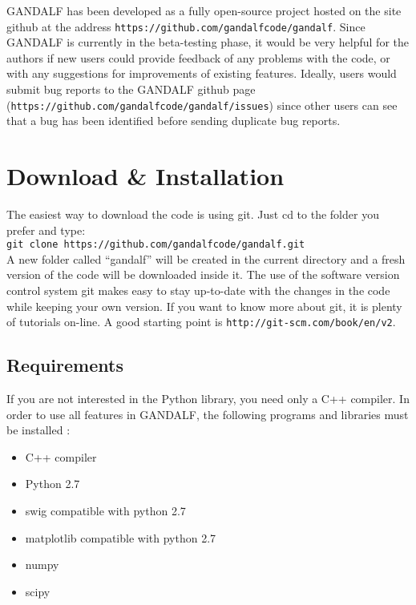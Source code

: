 \documentclass[a4paper]{article}
\newcommand{\var}[1]{\texttt{#1}}
\begin{document}
GANDALF has been developed as a fully open-source project hosted on the site github at the address \var{https://github.com/gandalfcode/gandalf}.  Since GANDALF is currently in the beta-testing phase, it would be very helpful for the authors if new users could provide feedback of any problems with the code, or with any suggestions for improvements of existing features.  Ideally, users would submit bug reports to the GANDALF github page (\var{https://github.com/gandalfcode/gandalf/issues}) since other users can see that a bug has been identified before sending duplicate bug reports.


\newpage


\section{Download \& Installation} \label{S:INSTALL}
The easiest way to download the code is using git. Just cd to the folder you prefer and type:\\
\newline
\noindent \var{git clone https://github.com/gandalfcode/gandalf.git} \\
A new folder called ``gandalf'' will be created in the current directory and a fresh version of the code will be downloaded inside it. The use of the software version control system git makes easy to stay up-to-date with the changes in the code while keeping your own version. If you want to know more about git, it is plenty of tutorials on-line. A good starting point is \var{http://git-scm.com/book/en/v2}.

\subsection{Requirements}

If you are not interested in the Python library, you need only a C++ compiler. In order to use all features in GANDALF, the following programs and libraries must be installed :
\begin{itemize}
\item C++ compiler
\item Python 2.7
\item swig compatible with python 2.7
\item matplotlib compatible with python 2.7
\item numpy
\item scipy
\end{itemize}
\end{document}

